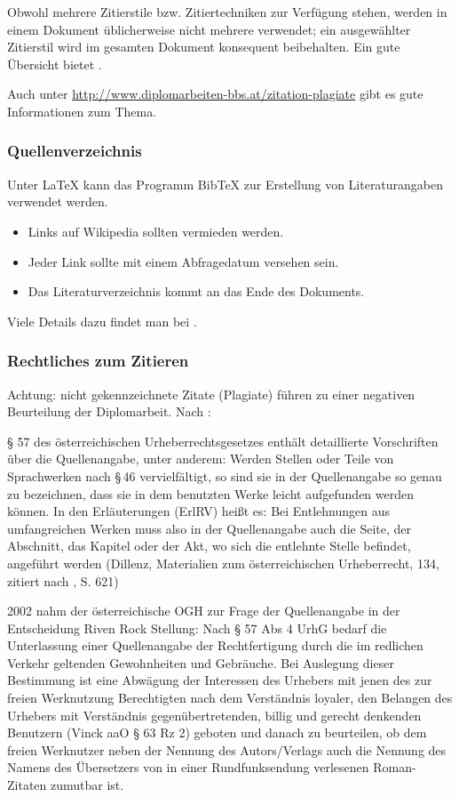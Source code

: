 Obwohl mehrere Zitierstile bzw. Zitiertechniken zur Verfügung stehen,
werden in einem Dokument üblicherweise nicht mehrere verwendet; ein
ausgewählter Zitierstil wird im gesamten Dokument konsequent beibehalten.
Ein gute Übersicht bietet \citep{wiki:zitat}.

Auch unter \url{http://www.diplomarbeiten-bbs.at/zitation-plagiate}
gibt es gute Informationen zum Thema.


\subsubsection{Quellenverzeichnis}

Unter \LaTeX{} kann das Programm Bib\TeX{} zur Erstellung von Literaturangaben
verwendet werden.
\begin{itemize}
\item Links auf Wikipedia sollten vermieden werden.\nopagebreak
\item Jeder Link sollte mit einem Abfragedatum versehen sein.\nopagebreak
\item Das Literaturverzeichnis kommt an das Ende des Dokuments.\nopagebreak
\end{itemize}
Viele Details dazu findet man bei \citep{wiki:zitat}.


\subsubsection{Rechtliches zum Zitieren}

Achtung: nicht gekennzeichnete Zitate (Plagiate) führen zu einer negativen
Beurteilung der Diplomarbeit. Nach \citep{wiki:quelle}:

§ 57 des österreichischen Urheberrechtsgesetzes\citep{ris57} enthält
detaillierte Vorschriften über die Quellenangabe, unter anderem: Werden
Stellen oder Teile von Sprachwerken nach §\,46 vervielfältigt, so
sind sie in der Quellenangabe so genau zu bezeichnen, dass sie in
dem benutzten Werke leicht aufgefunden werden können. In den Erläuterungen
(ErlRV) heißt es: Bei Entlehnungen aus umfangreichen Werken muss also
in der Quellenangabe auch die Seite, der Abschnitt, das Kapitel oder
der Akt, wo sich die entlehnte Stelle befindet, angeführt werden (Dillenz,
Materialien zum österreichischen Urheberrecht, 134, zitiert nach \citep{dittrich},
S. 621)

2002 nahm der österreichische OGH zur Frage der Quellenangabe in der
Entscheidung Riven Rock Stellung: Nach § 57 Abs 4 UrhG bedarf die
Unterlassung einer Quellenangabe der Rechtfertigung durch die im redlichen
Verkehr geltenden Gewohnheiten und Gebräuche. Bei Auslegung dieser
Bestimmung ist eine Abwägung der Interessen des Urhebers mit jenen
des zur freien Werknutzung Berechtigten nach dem Verständnis loyaler,
den Belangen des Urhebers mit Verständnis gegenübertretenden, billig
und gerecht denkenden Benutzern (Vinck aaO § 63 Rz 2) geboten und
danach zu beurteilen, ob dem freien Werknutzer neben der Nennung des
Autors/Verlags auch die Nennung des Namens des Übersetzers von in
einer Rundfunksendung verlesenen Roman-Zitaten zumutbar ist.


